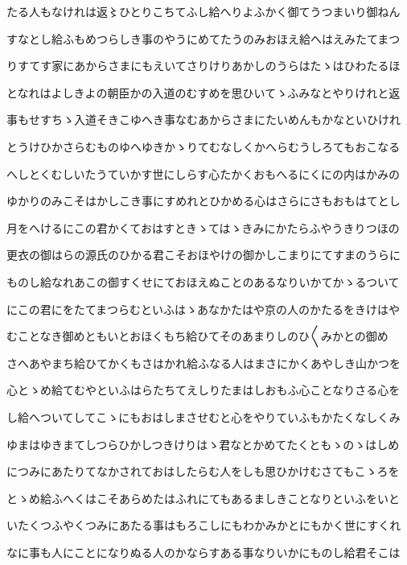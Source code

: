 \documentclass[a4paper,11pt,landscape]{ltjtarticle}
\begin{document}
たる人もなけれは返〻ひとりこちてふし給へりよふかく御てうつまいり御ねん
\par\medskip
すなとし給ふもめつらしき事のやうにめてたうのみおほえ給へはえみたてまつ
\par\medskip
りすてす家にあからさまにもえいてさりけりあかしのうらはたゝはひわたるほ
\par\medskip
となれはよしきよの朝臣かの入道のむすめを思ひいてゝふみなとやりけれと返
\par\medskip
事もせすちゝ入道そきこゆへき事なむあからさまにたいめんもかなといひけれ
\par\medskip
とうけひかさらむものゆへゆきかゝりてむなしくかへらむうしろてもおこなる
\par\medskip
へしとくむしいたうていかす世にしらす心たかくおもへるにくにの内はかみの
\par\medskip
ゆかりのみこそはかしこき事にすめれとひかめる心はさらにさもおもはてとし
\par\medskip
月をへけるにこの君かくておはすときゝてはゝきみにかたらふやうきりつほの
\par\medskip
更衣の御はらの源氏のひかる君こそおほやけの御かしこまりにてすまのうらに
\par\medskip
ものし給なれあこの御すくせにておほえぬことのあるなりいかてかゝるついて
\par\medskip
にこの君にをたてまつらむといふはゝあなかたはや京の人のかたるをきけはや
\par\medskip
むことなき御めともいとおほくもち給ひてそのあまりしのひ〱みかとの御め
\par\medskip
さへあやまち給ひてかくもさはかれ給ふなる人はまさにかくあやしき山かつを
\par\medskip
心とゝめ給てむやといふはらたちてえしりたまはしおもふ心ことなりさる心を
\par\medskip
し給へついてしてこゝにもおはしまさせむと心をやりていふもかたくなしくみ
\par\medskip
ゆまはゆきまてしつらひかしつきけりはゝ君なとかめてたくともゝのゝはしめ
\par\medskip
につみにあたりてなかされておはしたらむ人をしも思ひかけむさてもこゝろを
\par\medskip
とゝめ給ふへくはこそあらめたはふれにてもあるましきことなりといふをいと
\par\medskip
いたくつふやくつみにあたる事はもろこしにもわかみかとにもかく世にすくれ
\par\medskip
なに事も人にことになりぬる人のかならすある事なりいかにものし給君そこは
\par\medskip
\end{document}
